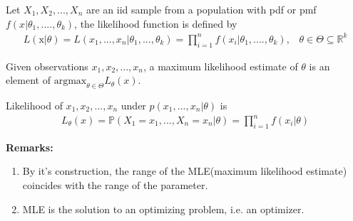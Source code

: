 \documentclass[a4paper,english,12pt]{article}
\begin{document}
Let $X_1,X_2,...,X_n$ are an iid sample from a population with pdf or pmf $f(x|\theta_1,....,\theta_k)$, the likelihood function is defined by
\begin{align}
L(\mathrm{x}|\theta)=L(x_1,...,x_n|\theta_1,...,\theta_k)=\prod\limits_{i=1}^n f(x_i|\theta_1,....,\theta_k),\,\,\,\,\,\theta \in \Theta\subseteq\mathbb{R}^k
\end{align} 
\begin{defn}{Given observations $x_1,x_2,...,x_n$, a maximum likelihood estimate of $\theta$ is an element of $\mathrm{argmax}_{\theta \in \Theta}L_{\theta}(x)$.}


Likelihood of $x_1,x_2,...,x_n$ under $p(x_1,...,x_n|\theta)$ is
\begin{align}
L_{\theta}(x) = \mathbb{P}(X_1=x_1,...,X_n=x_n|\theta)=\prod\limits_{i=1}^n f(x_i|\theta)
\end{align} 
\end{defn}
\textbf{Remarks:}
\begin{enumerate}
\item By it's construction, the range of the MLE(maximum likelihood estimate) coincides with the range of the parameter.
\item MLE is the solution to an optimizing problem, i.e. an optimizer. 
\end{enumerate}
\end{document}
